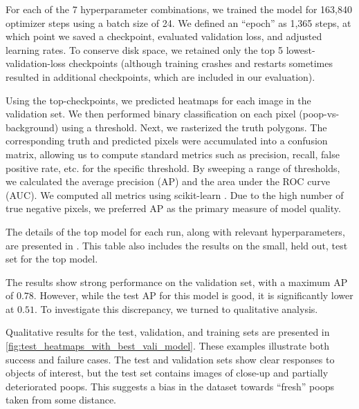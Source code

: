\begin{table*}[t]
\begin{tabular}{llllllll}
\bottomrule
\end{tabular}
\end{table*}

\begin{comment}
    SeeAlso:
    ~/code/shitspotter/experiments/geowatch-experiments/run_pixel_eval_on_vali_pipeline.sh
    python ~/code/shitspotter/dev/poc/estimate_train_resources.py
\end{comment}

For each of the 7 hyperparameter combinations, we trained the model for 163,840 optimizer steps using a
  batch size of 24.
We defined an ``epoch'' as 1,365 steps, at which point we saved a checkpoint, evaluated validation loss, and
  adjusted learning rates.
To conserve disk space, we retained only the top 5 lowest-validation-loss checkpoints (although training
  crashes and restarts sometimes resulted in additional checkpoints, which are included in our evaluation).

Using the top-checkpoints, we predicted heatmaps for each image in the validation set.
We then performed binary classification on each pixel (poop-vs-background) using a threshold.
Next, we rasterized the truth polygons.
The corresponding truth and predicted pixels were accumulated into a confusion matrix, allowing us to
  compute standard metrics such as precision, recall, false positive rate, etc.
\cite{powers_evaluation_2011} for the specific threshold.
By sweeping a range of thresholds, we calculated the average precision (AP) and the area under the ROC curve
  (AUC).
We computed all metrics using scikit-learn \cite{scikit-learn}.
Due to the high number of true negative pixels, we preferred AP as the primary measure of model quality.
  
The details of the top model for each run, along with relevant hyperparameters, are presented in
  .
This table also includes the results on the small, held out, test set for the top model.

The results show strong performance on the validation set, with a maximum AP of $0.78$.
However, while the test AP for this model is good, it is significantly lower at $0.51$.
To investigate this discrepancy, we turned to qualitative analysis.

Qualitative results for the test, validation, and training sets are presented in
  \cref{fig:test_heatmaps_with_best_vali_model}.
These examples illustrate both success and failure cases.
The test and validation sets show clear responses to objects of interest, but the test set contains images
  of close-up and partially deteriorated poops.
This suggests a bias in the dataset towards ``fresh'' poops taken from some distance.

